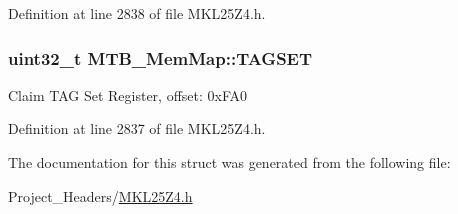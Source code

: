 Definition at line 2838 of file M\+K\+L25\+Z4.\+h.

\subsubsection[{\texorpdfstring{T\+A\+G\+S\+ET}{TAGSET}}]{\setlength{\rightskip}{0pt plus 5cm}uint32\+\_\+t M\+T\+B\+\_\+\+Mem\+Map\+::\+T\+A\+G\+S\+ET}\hypertarget{struct_m_t_b___mem_map_a5709bb3455f82d56406ad14e3a8c182e}{}\label{struct_m_t_b___mem_map_a5709bb3455f82d56406ad14e3a8c182e}
Claim T\+AG Set Register, offset\+: 0x\+F\+A0 

Definition at line 2837 of file M\+K\+L25\+Z4.\+h.



The documentation for this struct was generated from the following file\+:\begin{DoxyCompactItemize}
\item 
Project\+\_\+\+Headers/\hyperlink{_m_k_l25_z4_8h}{M\+K\+L25\+Z4.\+h}\end{DoxyCompactItemize}
